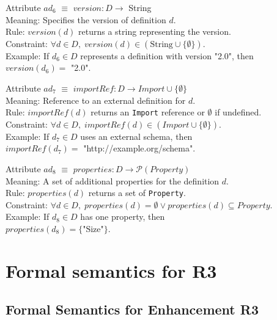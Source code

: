 \documentclass{article}
\begin{document}
Attribute \( ad_6 \) $\equiv$ \( version : D \rightarrow \) String \\
Meaning: Specifies the version of definition \( d \). \\
Rule: \( version(d) \) returns a string representing the version. \\
Constraint: \( \forall d \in D,\; version(d) \in (\text{String} \cup \{ \emptyset \}) \). \\
Example: If \( d_6 \in D \) represents a definition with version "2.0", then \\ 
\( version(d_6) = \) "2.0".

\vspace{0.8em}

Attribute \( ad_7 \) $\equiv$ \( importRef : D \rightarrow \mathit{Import} \cup \{ \emptyset \} \) \\
Meaning: Reference to an external definition for \( d \). \\
Rule: \( importRef(d) \) returns an \texttt{Import} reference or \(\emptyset\) if undefined. \\
Constraint: \( \forall d \in D,\; importRef(d) \in (\mathit{Import} \cup \{ \emptyset \}) \). \\
Example: If \( d_7 \in D \) uses an external schema, then \\
\( importRef(d_7) = \) "http://example.org/schema".

\vspace{0.8em}

Attribute \( ad_8 \) $\equiv$ \( properties : D \rightarrow \mathcal{P}(\mathit{Property}) \) \\
Meaning: A set of additional properties for the definition \( d \). \\
Rule: \( properties(d) \) returns a set of \texttt{Property}. \\
Constraint: \( \forall d \in D,\; properties(d) = \emptyset \vee properties(d) \subseteq \mathit{Property} \). \\
Example: If \( d_8 \in D \) has one property, then \\
\( properties(d_8) = \{ \text{"Size"} \} \).

\section{Formal semantics for R3}

\subsection*{Formal Semantics for Enhancement R3}
\end{document}
